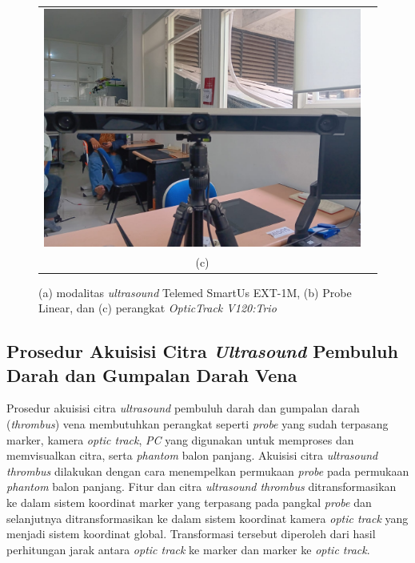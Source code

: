 \begin{figure}[h]
	\begin{tabular}{ll}
		\includegraphics[scale=0.12]{bab3/img_optic_track.jpg}\\
		\multicolumn{1}{c}{(c)}  
		
	\end{tabular}
	\caption{(a) modalitas \textit{ultrasound} Telemed SmartUs EXT-1M, (b) Probe Linear, dan (c) perangkat \textit{OpticTrack V120:Trio}}
	\label{Fig:tools_data_acquition}
\end{figure}





\subsection{Prosedur Akuisisi Citra \textit{Ultrasound} Pembuluh Darah dan Gumpalan Darah Vena}
Prosedur akuisisi citra \textit{ultrasound} pembuluh darah dan gumpalan darah (\textit{thrombus}) vena membutuhkan perangkat  seperti \textit{probe} yang sudah terpasang marker, kamera \textit{optic track}, \textit{PC} yang digunakan untuk memproses dan memvisualkan citra, serta \textit{phantom} balon panjang. Akuisisi citra \textit{ultrasound thrombus} dilakukan dengan cara menempelkan permukaan \textit{probe} pada permukaan \textit{phantom} balon panjang. Fitur dan citra \textit{ultrasound thrombus} ditransformasikan ke dalam sistem koordinat marker yang terpasang pada pangkal \textit{probe} dan selanjutnya ditransformasikan ke dalam sistem koordinat kamera \textit{optic track} yang menjadi sistem koordinat global. Transformasi tersebut diperoleh dari hasil perhitungan jarak antara \textit{optic track} ke marker dan marker ke \textit{optic track}. 

